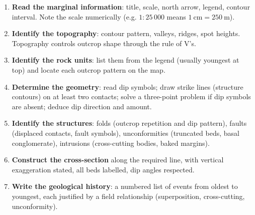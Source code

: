 \documentclass[11pt]{article}
\newcommand{\cle}[1]{{\popxbold\color{popdark}#1}}
\begin{document}
\begin{methode}
\begin{enumerate}
\item \textbf{Read the marginal information}: title, scale, north arrow, legend, contour interval. Note the scale numerically (e.g. $1:25\,000$ means $1\ \mathrm{cm} = 250\ \mathrm{m}$).
\item \textbf{Identify the topography}: contour pattern, valleys, ridges, spot heights. Topography controls outcrop shape through the rule of V's.
\item \textbf{Identify the rock units}: list them from the legend (usually youngest at top) and locate each outcrop pattern on the map.
\item \textbf{Determine the geometry}: read dip symbols; draw \cle{strike lines} (structure contours) on at least two contacts; solve a three-point problem if dip symbols are absent; deduce dip direction and amount.
\item \textbf{Identify the structures}: folds (outcrop repetition and dip pattern), faults (displaced contacts, fault symbols), unconformities (truncated beds, basal conglomerate), intrusions (cross-cutting bodies, baked margins).
\item \textbf{Construct the cross-section} along the required line, with vertical exaggeration stated, all beds labelled, dip angles respected.
\item \textbf{Write the geological history}: a numbered list of events from oldest to youngest, each justified by a field relationship (superposition, cross-cutting, unconformity).
\end{enumerate}
\end{methode}
\end{document}
